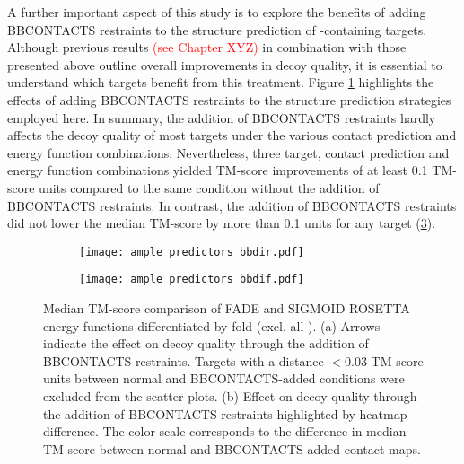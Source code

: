 A further important aspect of this study is to explore the benefits of adding BBCONTACTS restraints to the structure prediction of \textbeta-containing targets. Although previous results \textcolor{red}{(see Chapter XYZ)} in combination with those presented above outline overall improvements in decoy quality, it is essential to understand which targets benefit from this treatment. Figure \ref{fig:ample_predictor_bbdir} highlights the effects of adding BBCONTACTS restraints to the structure prediction strategies employed here. In summary, the addition of BBCONTACTS restraints hardly affects the decoy quality of most targets under the various contact prediction and energy function combinations. Nevertheless, three target, contact prediction and energy function combinations yielded TM-score improvements of at least 0.1 TM-score units compared to the same condition without the addition of BBCONTACTS restraints. In contrast, the addition of BBCONTACTS restraints did not lower the median TM-score by more than 0.1 units for any target (\cref{fig:ample_predictor_bbdif}).

\begin{figure}[H]
    \centering
    \begin{subfigure}[b]{\textwidth}
        \centering
        \texttt{[image: ample\_predictors\_bbdir.pdf]}
        \caption{}
        \label{fig:ample_predictor_bbdir}
    \end{subfigure}
    
    \begin{subfigure}[b]{\textwidth}
        \centering
        \texttt{[image: ample\_predictors\_bbdif.pdf]}
        \caption{}
        \label{fig:ample_predictor_bbdif}
    \end{subfigure}

    \caption{Median TM-score comparison of FADE and SIGMOID ROSETTA energy functions differentiated by fold (excl. all-\textalpha). (a) Arrows indicate the effect on decoy quality through the addition of BBCONTACTS restraints. Targets with a distance $<0.03$ TM-score units between normal and BBCONTACTS-added conditions were excluded from the scatter plots. (b) Effect on decoy quality through the addition of BBCONTACTS restraints highlighted by heatmap difference. The color scale corresponds to the difference in median TM-score between normal and BBCONTACTS-added contact maps.}
\end{figure}

